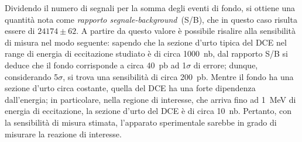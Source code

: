 Dividendo il numero di segnali per la somma degli eventi di fondo, si ottiene una quantità nota come \emph{rapporto segnale-background}~(S/B), che in questo caso risulta essere di $24174 \pm 62$.
A partire da questo valore è possibile risalire alla sensibilità di misura nel modo seguente: sapendo che la sezione d'urto tipica del DCE nel range di energia di eccitazione studiato è di circa 1000~nb, dal rapporto S/B si deduce che il fondo corrisponde a circa 40~pb ad 1$\sigma$ di errore; dunque, considerando 5$\sigma$, si trova una sensibilità di circa 200~pb.
Mentre il fondo ha una sezione d'urto circa costante, quella del DCE ha una forte dipendenza dall'energia; in particolare, nella regione di interesse, che arriva fino ad 1~MeV di energia di eccitazione, la sezione d'urto del DCE è di circa 10~nb.
Pertanto, con la sensibilità di misura stimata, l'apparato sperimentale sarebbe in grado di misurare la reazione di interesse.







\subsection*{}




